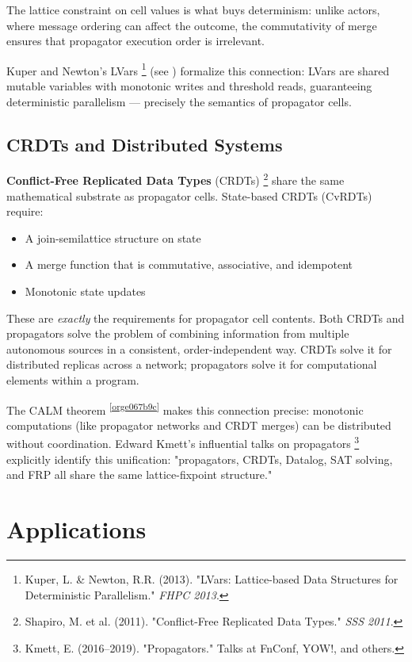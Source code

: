 \documentclass[11pt]{article}
\begin{document}
The lattice constraint on cell values is what buys determinism: unlike
actors, where message ordering can affect the outcome, the commutativity
of merge ensures that propagator execution order is irrelevant.

Kuper and Newton's LVars \footnote{Kuper, L. \& Newton, R.R. (2013). "LVars: Lattice-based Data
Structures for Deterministic Parallelism." \emph{FHPC 2013}.} (see ) formalize this connection: LVars are shared mutable
variables with monotonic writes and threshold reads, guaranteeing
deterministic parallelism --- precisely the semantics of propagator
cells.
\subsection{CRDTs and Distributed Systems}
\label{sec:org561d394}

\textbf{Conflict-Free Replicated Data Types} (CRDTs) \footnote{Shapiro, M. et al. (2011). "Conflict-Free Replicated Data
Types." \emph{SSS 2011}.} share the
same mathematical substrate as propagator cells. State-based CRDTs
(CvRDTs) require:

\begin{itemize}
\item A join-semilattice structure on state
\item A merge function that is commutative, associative, and idempotent
\item Monotonic state updates
\end{itemize}

These are \emph{exactly} the requirements for propagator cell contents.
Both CRDTs and propagators solve the problem of combining information
from multiple autonomous sources in a consistent, order-independent
way. CRDTs solve it for distributed replicas across a network;
propagators solve it for computational elements within a program.

The CALM theorem \textsuperscript{\ref{orge067b9c}} makes this connection precise: monotonic
computations (like propagator networks and CRDT merges) can be
distributed without coordination. Edward Kmett's influential talks on
propagators \footnote{Kmett, E. (2016--2019). "Propagators." Talks at FnConf,
YOW!, and others.} explicitly identify this unification: "propagators,
CRDTs, Datalog, SAT solving, and FRP all share the same
lattice-fixpoint structure."
\section{Applications}
\label{sec:orga9bab48}
\end{document}
